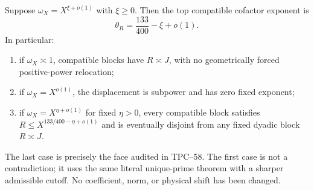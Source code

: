 \begin{corollary}
\label{cor:tpc59-three-cutoff-regimes}
Suppose \(\omega_X=X^{\xi+o(1)}\) with \(\xi\ge0\).  Then the top
compatible cofactor exponent is
\begin{equation}
 \theta_R=\frac{133}{400}-\xi+o(1).
 \label{eq:tpc59-compatible-theta-R}
\end{equation}
In particular:
\begin{enumerate}[label=\textup{(\alph*)},leftmargin=3em]
 \item if \(\omega_X\asymp1\), compatible blocks have
       \(R\asymp J\), with no geometrically forced positive-power
       relocation;
 \item if \(\omega_X=X^{o(1)}\), the displacement is subpower and has zero
       fixed exponent;
 \item if \(\omega_X=X^{\eta+o(1)}\) for fixed \(\eta>0\), every
       compatible block satisfies
       \(R\le X^{133/400-\eta+o(1)}\) and is eventually disjoint from any
       fixed dyadic block \(R\asymp J\).
\end{enumerate}
\end{corollary}

The last case is precisely the face audited in TPC--58.  The first case is
not a contradiction; it uses the same literal unique-prime theorem with a
sharper admissible cutoff.  No coefficient, norm, or physical shift has
been changed.
